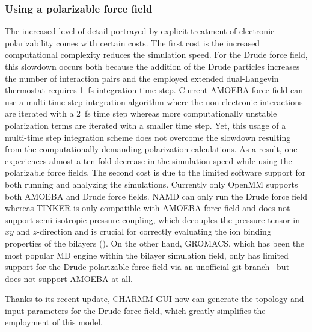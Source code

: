 \documentclass[journal=jacsat,manuscript=article,layout=singlecolumn]{achemso}
\begin{document}
\subsubsection{Using a polarizable force field}

The increased level of detail portrayed by explicit treatment of electronic polarizability comes with certain costs. The first cost is the increased computational complexity reduces the simulation speed. For the Drude force field, this slowdown occurs both because the addition of the Drude particles increases the number of interaction pairs and the employed extended dual-Langevin thermostat requires 1~fs integration time step. Current AMOEBA force field can use a multi time-step integration algorithm where the non-electronic interactions are iterated with a 2~fs time step whereas more computationally unstable polarization terms are iterated with a smaller time step. Yet, this usage of a multi-time step integration scheme does not overcome the slowdown resulting from the computationally demanding polarization calculations. As a result, one experiences almost a ten-fold decrease in the simulation speed while using the polarizable force fields. The second cost is due to the limited software support for both running and analyzing the simulations. Currently only OpenMM supports both AMOEBA and Drude force fields. NAMD can only run the Drude force field whereas TINKER is only compatible with AMOEBA force field and does not support semi-isotropic pressure coupling, which decouples the pressure tensor in $xy$ and $z$-direction and is crucial for correctly evaluating the ion binding properties of the bilayers (). On the other hand, GROMACS, which has been the most popular MD engine within the bilayer simulation field, only has limited support for the Drude polarizable force field via an unofficial git-branch~\cite{drudegithub} but does not support AMOEBA at all.

Thanks to its recent update, CHARMM-GUI now can generate the topology and input parameters for the Drude force field, which greatly simplifies the employment of this model.
\end{document}
